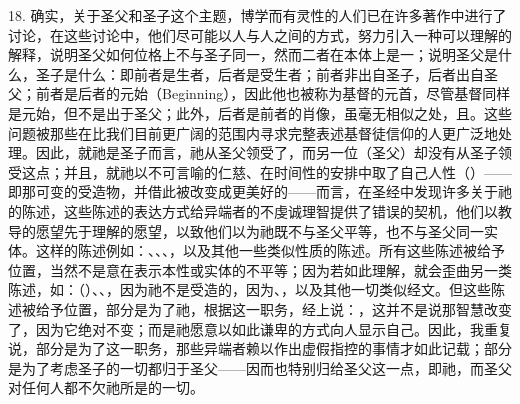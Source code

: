 18. 确实，关于圣父和圣子这个主题，博学而有灵性的人们已在许多著作中进行了讨论，在这些讨论中，他们尽可能以人与人之间的方式，努力引入一种可以理解的解释，说明圣父如何位格上不与圣子同一，然而二者在本体上是一；说明圣父是什么，圣子是什么：即前者是生者，后者是受生者；前者非出自圣子，后者出自圣父；前者是后者的元始（Beginning），因此他也被称为基督的元首，尽管基督同样是元始，但不是出于圣父；此外，后者是前者的肖像，虽毫无相似之处，且。这些问题被那些在比我们目前更广阔的范围内寻求完整表述基督徒信仰的人更广泛地处理。因此，就祂是圣子而言，祂从圣父领受了，而另一位（圣父）却没有从圣子领受这点；并且，就祂以不可言喻的仁慈、在时间性的安排中取了自己人性（）——即那可变的受造物，并借此被改变成更美好的——而言，在圣经中发现许多关于祂的陈述，这些陈述的表达方式给异端者的不虔诚理智提供了错误的契机，他们以教导的愿望先于理解的愿望，以致他们以为祂既不与圣父平等，也不与圣父同一实体。这样的陈述例如：、、、，以及其他一些类似性质的陈述。所有这些陈述被给予位置，当然不是意在表示本性或实体的不平等；因为若如此理解，就会歪曲另一类陈述，如：（）、、，因为祂不是受造的，因为、，以及其他一切类似经文。但这些陈述被给予位置，部分是为了祂，根据这一职务，经上说：，这并不是说那智慧改变了，因为它绝对不变；而是祂愿意以如此谦卑的方式向人显示自己。因此，我重复说，部分是为了这一职务，那些异端者赖以作出虚假指控的事情才如此记载；部分是为了考虑圣子的一切都归于圣父——因而也特别归给圣父这一点，即祂，而圣父对任何人都不欠祂所是的一切。\par

